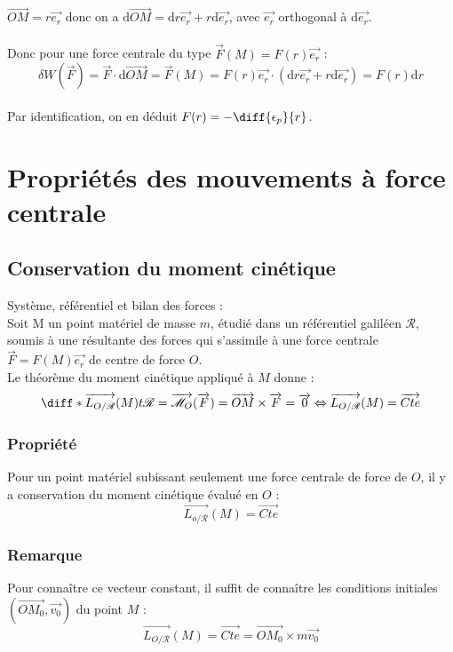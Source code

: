 \documentclass[a4paper,10pt]{book} %
\begin{document}
$\overrightarrow{OM}=r\overrightarrow{e_r}$ donc on a $\text{d}\overrightarrow{OM}=\text{d}r\overrightarrow{e_r}+r\text{d}\overrightarrow{e_r}$, avec $\overrightarrow{e_r}$ orthogonal à d$\overrightarrow{e_r}$.\\\\

Donc pour une force centrale du type $\overrightarrow{F}(M)=F(r)\overrightarrow{e_r}$ :
$$\delta W(\overrightarrow{F})=\overrightarrow{F}\cdot \text{d}\overrightarrow{OM}= \overrightarrow{F}(M)= F(r)\overrightarrow{e_r}\cdot (\text{d}r\overrightarrow{e_r}+r\text{d}\overrightarrow{e_r})=F(r)\text{d}r$$\\

Par identification, on en déduit $F(r)=-\diff{\epsilon_p}{r}$.

\newpage

\section{Propriétés des mouvements à force centrale}
\subsection{Conservation du moment cinétique}
Système, référentiel et bilan des forces :\\
Soit M un point matériel de masse $m$, étudié dans un référentiel galiléen $\mathcal{R}$, soumis à une résultante des forces qui s'assimile à une force centrale $\overrightarrow{F}=F(M)\overrightarrow{e_r}$ de centre de force $O$.\\

Le théorème du moment cinétique appliqué à $M$ donne :
$$\diff*{\overrightarrow{L_{O/\mathcal{R}}}(M)}{t}{\mathcal{R}}= \overrightarrow{\mathcal{M}_O}(\overrightarrow{F}) =\overrightarrow{OM}\times \overrightarrow{F} =\overrightarrow{0} \Leftrightarrow \overrightarrow{L_{O/\mathcal{R}}}(M) =\overrightarrow{Cte}$$

\subsubsection{Propriété}
Pour un point matériel subissant seulement une force centrale de force de $O$, il y a conservation du moment cinétique évalué en $O$ : $$\overrightarrow{L_{o/\mathcal{R}}}(M)=\overrightarrow{Cte}$$

\subsubsection{Remarque}
Pour connaître ce vecteur constant, il suffit de connaître les conditions initiales $(\overrightarrow{OM_0},\overrightarrow{v_0})$ du point $M$ :
$$\overrightarrow{L_{O/\mathcal{R}}}(M)=\overrightarrow{Cte}=\overrightarrow{OM_0}\times m\overrightarrow{v_0}$$
\end{document}
